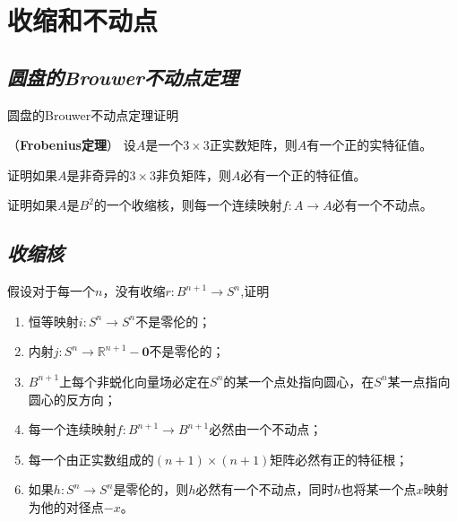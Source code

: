 \section{收缩和不动点}

\subsection*{\textsl{圆盘的Brouwer不动点定理}}

\begin{mdframed}
    \begin{question}
        圆盘的Brouwer不动点定理证明
    \end{question}
\end{mdframed}

\begin{mdframed}
    \begin{question}（\textbf{Frobenius定理}）
        设$A$是一个$3\times 3$正实数矩阵，则$A$有一个正的实特征值。
    \end{question}
\end{mdframed}

\begin{mdframed}
    \begin{question}
        证明如果$A$是非奇异的$3\times 3$非负矩阵，则$A$必有一个正的特征值。
    \end{question}
\end{mdframed}

\begin{mdframed}
    \begin{question}
        证明如果$A$是$B^2$的一个收缩核，则每一个连续映射$f:A\rightarrow A$必有一个不动点。
    \end{question}
\end{mdframed}

\subsection*{\textsl{收缩核}}

\begin{mdframed}
    \begin{question}
        假设对于每一个$n$，没有收缩$r:B^{n+1}\rightarrow S^n$,证明
        \begin{enumerate}[itemindent=2em]
            \item 恒等映射$i:S^n\rightarrow S^n$不是零伦的；
            \item 内射$j:S^n\rightarrow \mathbb{R}^{n+1}-\mathbf{0}$不是零伦的；
            \item $B^{n+1}$上每个非蜕化向量场必定在$S^n$的某一个点处指向圆心，在$S^n$某一点指向圆心的反方向；
            \item 每一个连续映射$f:B^{n+1}\rightarrow B^{n+1}$必然由一个不动点；
            \item 每一个由正实数组成的$(n+1)\times (n+1)$矩阵必然有正的特征根；
            \item 如果$h:S^n\rightarrow S^n$是零伦的，则$h$必然有一个不动点，同时$h$也将某一个点$x$映射为他的对径点$-x$。
        \end{enumerate}
    \end{question}
\end{mdframed}

